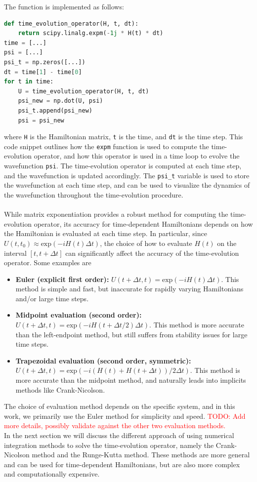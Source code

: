 \documentclass{subfiles}
\begin{document}
The function is implemented as follows:
\begin{lstlisting}[language=Python]
def time_evolution_operator(H, t, dt):
    return scipy.linalg.expm(-1j * H(t) * dt)
time = [...]
psi = [...]
psi_t = np.zeros([...])
dt = time[1] - time[0] 
for t in time:
    U = time_evolution_operator(H, t, dt)
    psi_new = np.dot(U, psi)
    psi_t.append(psi_new)
    psi = psi_new
\end{lstlisting}
where \texttt{H} is the Hamiltonian matrix, \texttt{t} is the time, and \texttt{dt} is the time step. This code snippet outlines how the \texttt{expm} function is used to compute the time-evolution operator, and how this operator is used in a time loop to evolve the wavefunction \texttt{psi}. The time-evolution operator is computed at each time step, and the wavefunction is updated accordingly. The \texttt{psi\_t} variable is used to store the wavefunction at each time step, and can be used to visualize the dynamics of the wavefunction throughout the time-evolution procedure. \\ \\ 
While matrix exponentiation provides a robust method for computing the time-evolution operator, its accuracy for time-dependent Hamiltonians depends on how the Hamiltonian is evaluated at each time step. In particular, since $U(t, t_0) \approx \text{exp}(-iH(t)\Delta t)$, the choice of how to evaluate $H(t)$ on the interval $[t, t + \Delta t]$ can significantly affect the accuracy of the time-evolution operator. Some examples are
\begin{itemize}
    \item \textbf{Euler (explicit first order):} $U(t + \Delta t, t) = \text{exp}(-iH(t)\Delta t)$. This method is simple and fast, but inaccurate for rapidly varying Hamiltonians and/or large time steps. 
    \item \textbf{Midpoint evaluation (second order):} $U(t + \Delta t, t) = \text{exp}(-iH(t + \Delta t/2)\Delta t)$. This method is more accurate than the left-endpoint method, but still suffers from stability issues for large time steps.
    \item \textbf{Trapezoidal evaluation (second order, symmetric):} $U(t + \Delta t, t) = \text{exp}(-i(H(t) + H(t + \Delta t))/2 \Delta t)$. This method is more accurate than the midpoint method, and naturally leads into implicits methods like Crank-Nicolson. 
\end{itemize}
The choice of evaluation method depends on the specific system, and in this work, we primarily use the Euler method for simplicity and speed. \textcolor{red}{TODO: Add more details, possibly validate against the other two evaluation methods.} \\ In the next section we will discuss the different approach of using numerical integration methods to solve the time-evolution operator, namely the Crank-Nicolson method and the Runge-Kutta method. These methods are more general and can be used for time-dependent Hamiltonians, but are also more complex and computationally expensive.
\end{document}
